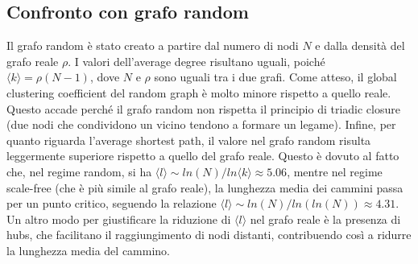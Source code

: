 \documentclass[sigchi]{acmart}
\begin{document}
\subsection{ Confronto con grafo random}
Il grafo random \cite{alfred1959publicationes} è stato creato a partire dal numero di nodi $N$ e dalla densità del grafo reale $\rho$. I valori dell'average degree risultano uguali, poiché $\langle k \rangle = \rho (N-1)$, dove $N$ e $\rho$ sono uguali tra i due grafi. Come atteso, il global clustering coefficient del random graph è molto minore rispetto a quello reale. Questo accade perché il grafo random non rispetta il principio di triadic closure (due nodi che condividono un vicino tendono a formare un legame). Infine, per quanto riguarda l'average shortest path, il valore nel grafo random risulta leggermente superiore rispetto a quello del grafo reale. Questo è dovuto al fatto che, nel regime random, si ha $\langle l \rangle \sim ln(N)/ln\langle k \rangle \approx 5.06$, mentre nel regime scale-free (che è più simile al grafo reale), la lunghezza media dei cammini passa per un punto critico, seguendo la relazione $\langle l \rangle \sim ln(N)/ln(ln(N)) \approx 4.31$. Un altro modo per giustificare la riduzione di $\langle l \rangle$ nel grafo reale è la presenza di hubs, che facilitano il raggiungimento di nodi distanti, contribuendo così a ridurre la lunghezza media del cammino.
\end{document}
